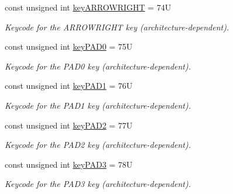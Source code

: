 \begin{DoxyCompactItemize}
const unsigned int \hyperlink{namespacecimg__library__suffixed_1_1cimg_a53356b50ce24342226fb50c6091105f6}{key\+A\+R\+R\+O\+W\+R\+I\+G\+HT} = 74U
\begin{DoxyCompactList}\small\item\em Keycode for the {\ttfamily A\+R\+R\+O\+W\+R\+I\+G\+HT} key (architecture-\/dependent). \end{DoxyCompactList}\item 
\mbox{\label{namespacecimg__library__suffixed_1_1cimg_a63eede01a9c10de3b838e6c85d5312a5}} 
const unsigned int \hyperlink{namespacecimg__library__suffixed_1_1cimg_a63eede01a9c10de3b838e6c85d5312a5}{key\+P\+A\+D0} = 75U
\begin{DoxyCompactList}\small\item\em Keycode for the {\ttfamily P\+A\+D0} key (architecture-\/dependent). \end{DoxyCompactList}\item 
\mbox{\label{namespacecimg__library__suffixed_1_1cimg_a3b679d9c0ba0afea29ad0d638fc1b58e}} 
const unsigned int \hyperlink{namespacecimg__library__suffixed_1_1cimg_a3b679d9c0ba0afea29ad0d638fc1b58e}{key\+P\+A\+D1} = 76U
\begin{DoxyCompactList}\small\item\em Keycode for the {\ttfamily P\+A\+D1} key (architecture-\/dependent). \end{DoxyCompactList}\item 
\mbox{\label{namespacecimg__library__suffixed_1_1cimg_a9fd2ac5535c44b257c8a58ad965c7b5b}} 
const unsigned int \hyperlink{namespacecimg__library__suffixed_1_1cimg_a9fd2ac5535c44b257c8a58ad965c7b5b}{key\+P\+A\+D2} = 77U
\begin{DoxyCompactList}\small\item\em Keycode for the {\ttfamily P\+A\+D2} key (architecture-\/dependent). \end{DoxyCompactList}\item 
\mbox{\label{namespacecimg__library__suffixed_1_1cimg_ae4f2d0de622d122416423ad821f8a391}} 
const unsigned int \hyperlink{namespacecimg__library__suffixed_1_1cimg_ae4f2d0de622d122416423ad821f8a391}{key\+P\+A\+D3} = 78U
\begin{DoxyCompactList}\small\item\em Keycode for the {\ttfamily P\+A\+D3} key (architecture-\/dependent). \end{DoxyCompactList}\item 

\end{DoxyCompactItemize}
